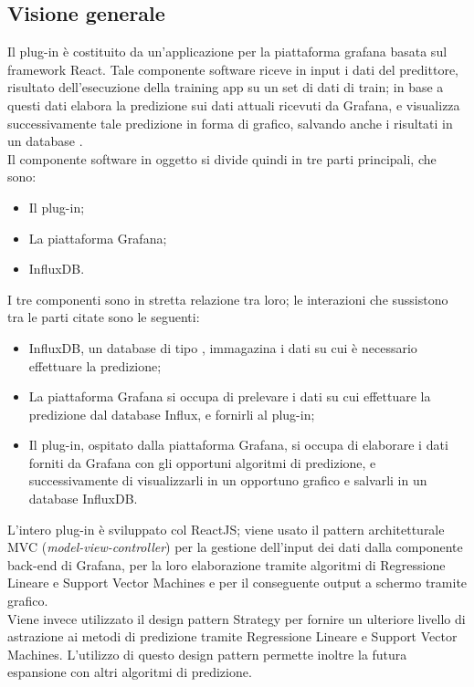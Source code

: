 \documentclass[../manuale-sviluppatore.tex]{subfiles}
\begin{document}
\subsection{Visione generale}
Il plug-in è costituito da un'applicazione per la piattaforma grafana basata sul framework React. Tale componente software riceve in input i dati del predittore, risultato dell'esecuzione della training app su un set di dati di train; in base a questi dati elabora la predizione sui dati attuali ricevuti da Grafana, e visualizza successivamente tale predizione in forma di grafico, salvando anche i risultati in un database . \\
Il componente software in oggetto si divide quindi in tre parti principali, che sono:
\begin{itemize}
  \item Il plug-in;
  \item La piattaforma Grafana;
  \item InfluxDB.
\end{itemize}

I tre componenti sono in stretta relazione tra loro; le interazioni che sussistono tra le parti citate sono le seguenti:
\begin{itemize}
  \item InfluxDB, un database di tipo , immagazina i dati su cui è necessario effettuare la predizione;
  \item La piattaforma Grafana si occupa di prelevare i dati su cui effettuare la predizione dal database Influx, e fornirli al plug-in;
  \item Il plug-in, ospitato dalla piattaforma Grafana, si occupa di elaborare i dati forniti da Grafana con gli opportuni algoritmi di predizione, e successivamente di visualizzarli in un opportuno grafico e salvarli in un database InfluxDB.
\end{itemize}

L'intero plug-in è sviluppato col  ReactJS; viene usato il pattern architetturale MVC (\textit{model-view-controller}) per la gestione dell'input dei dati dalla componente back-end di Grafana, per la loro elaborazione tramite algoritmi di Regressione Lineare e Support Vector Machines e per il conseguente output a schermo tramite grafico. \\
Viene invece utilizzato il design pattern Strategy per fornire un ulteriore livello di astrazione ai metodi di predizione tramite Regressione Lineare e Support Vector Machines. L'utilizzo di questo design pattern permette inoltre la futura espansione con altri algoritmi di predizione.
\end{document}
